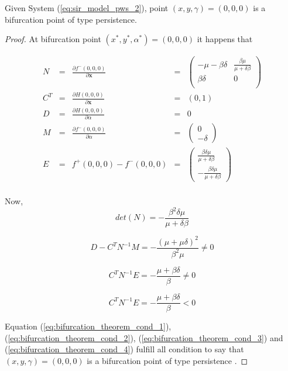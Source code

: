 \begin{theorem} Given System (\ref{eq:sir_model_pws_2}), point $(x,y,\gamma) = (0,0,0) $ is a bifurcation point of type persistence.
\end{theorem}

\begin{proof}
At bifurcation point $(x^*,y^*,\alpha^*) = (0,0,0) $ it happens that

\begin{equation}
    \begin{array}{ccccc}
        N &=& \frac{\partial f^-(0,0,0)}{\partial \textbf{x}} &=& 
        \left(
            \begin{array}{cc}
                -\mu-\beta\delta & \frac{\beta\mu}{\mu+\delta\beta} \\
                \beta\delta & 0 \\
            \end{array}
        \right) \\
        C^T &=& \frac{\partial H(0,0,0)}{\partial \textbf{x}} &=& \left(0,1\right) \\
        D &=& \frac{\partial H(0,0,0)}{\partial\alpha} &=& 0 \\
        M &=& \frac{\partial f^-(0,0,0)}{\partial\alpha} &=& \left( \begin{array}{c} 0 \\ -\delta \end{array} \right) \\
        E &=& f^+(0,0,0)-f^-(0,0,0) &=& \left( \begin{array}{c} \frac{\beta\delta\mu}{\mu+\delta\beta} \\ -\frac{\beta\delta\mu}{\mu+\delta\beta} \end{array} \right) \\
    \end{array}
\end{equation}

Now,
\begin{equation}
\label{eq:bifurcation_theorem_cond_1}
    det(N) = -\frac{\beta^2\delta\mu}{\mu+\delta\beta}
\end{equation}

\begin{equation}
\label{eq:bifurcation_theorem_cond_2}
    D-C^TN^{-1}M = -\frac{(\mu+\mu\delta)^2}{\beta^2\mu} \neq 0
\end{equation}

\begin{equation}
\label{eq:bifurcation_theorem_cond_3}
    C^TN^{-1}E = -\frac{\mu + \beta\delta}{\beta} \neq 0
\end{equation}

\begin{equation}
\label{eq:bifurcation_theorem_cond_4}
    C^TN^{-1}E = -\frac{\mu + \beta\delta}{\beta} < 0
\end{equation}

Equation (\ref{eq:bifurcation_theorem_cond_1}), (\ref{eq:bifurcation_theorem_cond_2}), (\ref{eq:bifurcation_theorem_cond_3}) and (\ref{eq:bifurcation_theorem_cond_4}) fulfill all condition to say that $(x,y,\gamma) = (0,0,0) $ is a bifurcation point of type persistence \cite[pp. 236]{bib:di_bernardo}.
\end{proof}
